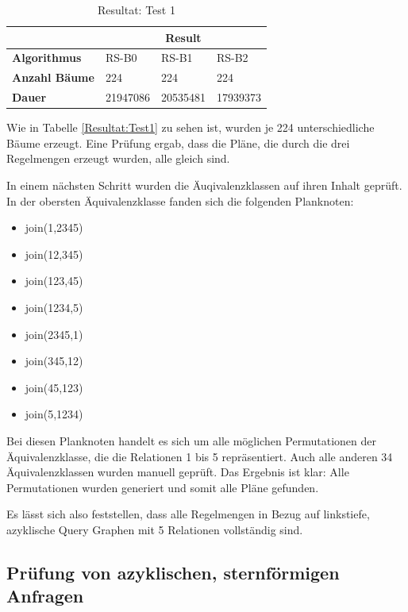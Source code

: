 \begin{table}[h]
\centering

\begin{tabular}{|l|l|l|l|}
\hline
                         & \multicolumn{3}{c|}{{\bf Result}} \\ \hline
{\bf Algorithmus}        & RS-B0     & RS-B1     & RS-B2     \\ \hline
{\bf Anzahl Bäume}       & 224       & 224       & 224       \\ \hline
{\bf Dauer}              & 21947086  & 20535481  & 17939373  \\ \hline
\end{tabular}

\caption{Resultat: Test 1}
\label{Result:Test1}
\end{table}

Wie in Tabelle \ref{Resultat:Test1} zu sehen ist, wurden je 224 unterschiedliche Bäume erzeugt. Eine Prüfung ergab, dass die Pläne, die durch die drei Regelmengen erzeugt wurden, alle gleich sind.

In einem nächsten Schritt wurden die Äuqivalenzklassen auf ihren Inhalt geprüft. In der obersten Äquivalenzklasse fanden sich die folgenden Planknoten:

\begin{itemize}
\item join(1,2345)
\item join(12,345)
\item join(123,45)
\item join(1234,5)
\item join(2345,1)
\item join(345,12)
\item join(45,123)
\item join(5,1234)
\end{itemize}

Bei diesen Planknoten handelt es sich um alle möglichen Permutationen der Äquivalenzklasse, die die Relationen 1 bis 5 repräsentiert. Auch alle anderen 34 Äquivalenzklassen wurden manuell geprüft. Das Ergebnis ist klar: Alle Permutationen wurden generiert und somit alle Pläne gefunden.

Es lässt sich also feststellen, dass alle Regelmengen in Bezug auf linkstiefe, azyklische Query Graphen mit 5 Relationen vollständig sind.

\subsection{Prüfung von azyklischen, sternförmigen Anfragen}

